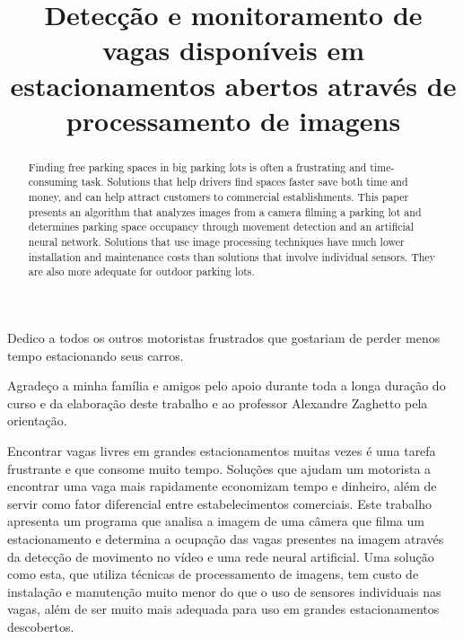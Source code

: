 \documentclass[bacharelado]{unb-cic}
\title{Detecção e monitoramento de vagas disponíveis em estacionamentos abertos através de processamento de imagens}
\begin{document}
  \maketitle
  \pretextual

  \begin{dedicatoria}
  Dedico a todos os outros motoristas frustrados que gostariam de perder menos tempo estacionando seus carros.
  \end{dedicatoria}

  \begin{agradecimentos}
  Agradeço a minha família e amigos pelo apoio durante toda a longa duração do curso e da elaboração deste trabalho e ao professor Alexandre Zaghetto pela orientação.
  \end{agradecimentos}

  \begin{resumo}
  Encontrar vagas livres em grandes estacionamentos muitas vezes é uma tarefa frustrante e que consome muito tempo. Soluções que ajudam um motorista a encontrar uma vaga mais rapidamente economizam tempo e dinheiro, além de servir como fator diferencial entre estabelecimentos comerciais. Este trabalho apresenta um programa que analisa a imagem de uma câmera que filma um estacionamento e determina a ocupação das vagas presentes na imagem através da detecção de movimento no vídeo e uma rede neural artificial. Uma solução como esta, que utiliza técnicas de processamento de imagens, tem custo de instalação e manutenção muito menor do que o uso de sensores individuais nas vagas, além de ser muito mais adequada para uso em grandes estacionamentos descobertos.
  \end{resumo}

  \begin{abstract}
  Finding free parking spaces in big parking lots is often a frustrating and time-consuming task. Solutions that help drivers find spaces faster save both time and money, and can help attract customers to commercial establishments. This paper presents an algorithm that analyzes images from a camera filming a parking lot and determines parking space occupancy through movement detection and an artificial neural network. Solutions that use image processing techniques have much lower installation and maintenance costs than solutions that involve individual sensors. They are also more adequate for outdoor parking lots.
  \end{abstract}

  \tableofcontents
  \listoffigures
  \listoftables

  \textual
  
	
	
	
	
	
	
  

  \postextual
  
  
\end{document}
